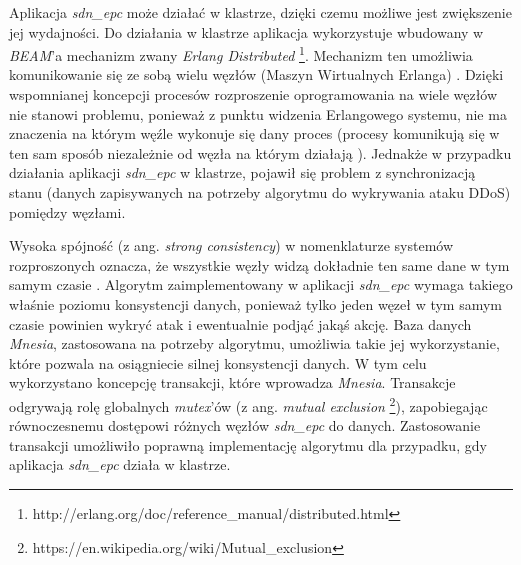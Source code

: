 Aplikacja \textit{sdn\_epc} może działać w klastrze, dzięki czemu możliwe jest
zwiększenie jej wydajności. Do działania w klastrze aplikacja wykorzystuje
wbudowany w \textit{BEAM}'a mechanizm zwany \textit{Erlang Distributed}
\footnote{http://erlang.org/doc/reference\_manual/distributed.html}. Mechanizm
ten umożliwia komunikowanie się ze sobą wielu węzłów (Maszyn Wirtualnych
Erlanga) \cite{erldocs}. Dzięki wspomnianej koncepcji procesów rozproszenie
oprogramowania na wiele węzłów nie stanowi problemu, ponieważ z punktu widzenia
Erlangowego systemu, nie ma znaczenia na którym węźle wykonuje się dany proces
(procesy komunikują się w ten sam sposób niezależnie od węzła na którym
działają \cite{erldocs}). Jednakże w przypadku działania aplikacji
\textit{sdn\_epc} w klastrze, pojawił się problem z synchronizacją stanu (danych
zapisywanych na potrzeby algorytmu do wykrywania ataku DDoS) pomiędzy węzłami.

Wysoka spójność (z ang. \textit{strong consistency}) w nomenklaturze systemów
rozproszonych oznacza, że wszystkie węzły widzą dokładnie ten same dane w
tym samym czasie \cite{distrforfunandprof}. Algorytm zaimplementowany w
aplikacji \textit{sdn\_epc} wymaga takiego właśnie poziomu konsystencji danych,
ponieważ tylko jeden węzeł w tym samym czasie powinien wykryć atak i ewentualnie
podjąć jakąś akcję. Baza danych \textit{Mnesia}, zastosowana na potrzeby
algorytmu, umożliwia takie jej wykorzystanie, które pozwala na osiągniecie
silnej konsystencji danych. W tym celu wykorzystano koncepcję transakcji, które
wprowadza \textit{Mnesia}. Transakcje odgrywają rolę globalnych
\textit{mutex}'ów (z ang. \textit{mutual exclusion}
\footnote{https://en.wikipedia.org/wiki/Mutual\_exclusion}), zapobiegając
równoczesnemu dostępowi różnych węzłów \textit{sdn\_epc} do danych. Zastosowanie
transakcji umożliwiło poprawną implementację algorytmu dla przypadku, gdy
aplikacja \textit{sdn\_epc} działa w klastrze.